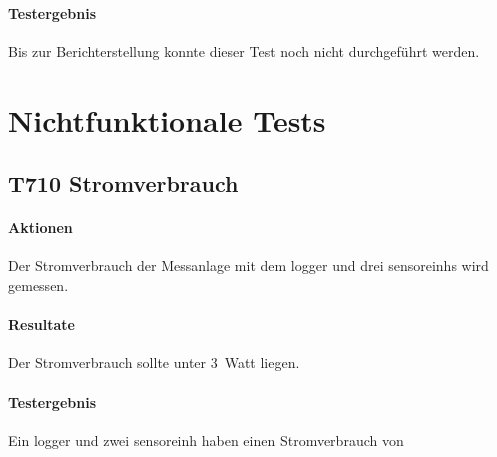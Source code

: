 \paragraph{Testergebnis} Bis zur Berichterstellung konnte dieser Test noch nicht durchgeführt werden.

\section{Nichtfunktionale Tests}
\subsection{T710 Stromverbrauch}
\paragraph{Aktionen} Der Stromverbrauch der Messanlage mit dem \gls{logger} und drei \glspl{sensoreinh} wird gemessen. 

\paragraph{Resultate} Der Stromverbrauch sollte unter 3~Watt liegen.

\paragraph{Testergebnis} Ein \gls{logger} und zwei \gls{sensoreinh} haben einen Stromverbrauch von 